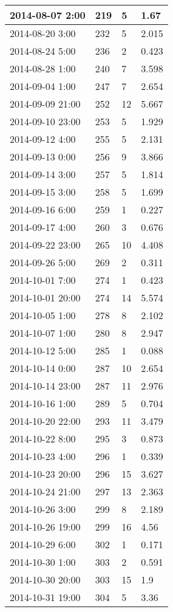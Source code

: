 \documentclass[
]{article}
\begin{document}
\begin{tabular}{l|l|l|l}
\hline
2014-08-07 2:00 & 219 & 5 & 1.67\\
\hline
2014-08-20 3:00 & 232 & 5 & 2.015\\
\hline
2014-08-24 5:00 & 236 & 2 & 0.423\\
\hline
2014-08-28 1:00 & 240 & 7 & 3.598\\
\hline
2014-09-04 1:00 & 247 & 7 & 2.654\\
\hline
2014-09-09 21:00 & 252 & 12 & 5.667\\
\hline
2014-09-10 23:00 & 253 & 5 & 1.929\\
\hline
2014-09-12 4:00 & 255 & 5 & 2.131\\
\hline
2014-09-13 0:00 & 256 & 9 & 3.866\\
\hline
2014-09-14 3:00 & 257 & 5 & 1.814\\
\hline
2014-09-15 3:00 & 258 & 5 & 1.699\\
\hline
2014-09-16 6:00 & 259 & 1 & 0.227\\
\hline
2014-09-17 4:00 & 260 & 3 & 0.676\\
\hline
2014-09-22 23:00 & 265 & 10 & 4.408\\
\hline
2014-09-26 5:00 & 269 & 2 & 0.311\\
\hline
2014-10-01 7:00 & 274 & 1 & 0.423\\
\hline
2014-10-01 20:00 & 274 & 14 & 5.574\\
\hline
2014-10-05 1:00 & 278 & 8 & 2.102\\
\hline
2014-10-07 1:00 & 280 & 8 & 2.947\\
\hline
2014-10-12 5:00 & 285 & 1 & 0.088\\
\hline
2014-10-14 0:00 & 287 & 10 & 2.654\\
\hline
2014-10-14 23:00 & 287 & 11 & 2.976\\
\hline
2014-10-16 1:00 & 289 & 5 & 0.704\\
\hline
2014-10-20 22:00 & 293 & 11 & 3.479\\
\hline
2014-10-22 8:00 & 295 & 3 & 0.873\\
\hline
2014-10-23 4:00 & 296 & 1 & 0.339\\
\hline
2014-10-23 20:00 & 296 & 15 & 3.627\\
\hline
2014-10-24 21:00 & 297 & 13 & 2.363\\
\hline
2014-10-26 3:00 & 299 & 8 & 2.189\\
\hline
2014-10-26 19:00 & 299 & 16 & 4.56\\
\hline
2014-10-29 6:00 & 302 & 1 & 0.171\\
\hline
2014-10-30 1:00 & 303 & 2 & 0.591\\
\hline
2014-10-30 20:00 & 303 & 15 & 1.9\\
\hline
2014-10-31 19:00 & 304 & 5 & 3.36\\
\hline
\end{tabular}
\end{document}
